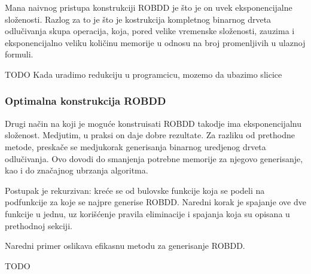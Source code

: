 Mana naivnog pristupa konstrukciji ROBDD je \v{s}to je on uvek eksponencijalne slo\v{z}enosti. Razlog za to je \v{s}to je kostrukcija kompletnog binarnog drveta odlu\v{c}ivanja skupa operacija, koja, pored velike vremenske slo\v{z}enosti, zauzima i eksponencijalno veliku koli\v{c}inu memorije u odnosu na broj promenljivih u ulaznoj formuli.

\begin{exmp}
    TODO
    Kada uradimo redukciju u programcicu, mozemo da ubazimo slicice
\end{exmp}


\subsubsection{Optimalna konstrukcija ROBDD}
\label{subsubsec:optimalROBDDConstruction}

Drugi na\v{c}in na koji je mogu\'c{}e konstruisati ROBDD takodje ima eksponencijalnu slo\v{z}enost. Medjutim, u praksi on daje dobre rezultate. Za razliku od prethodne metode, preska\v{c}e se medjukorak generisanja binarnog uredjenog drveta odlu\v{c}ivanja. Ovo dovodi do smanjenja potrebne memorije za njegovo generisanje, kao i do zna\v{c}ajnog ubrzanja algoritma.

Postupak je rekurzivan: kre\'c{}e se od bulovske funkcije koja se podeli na podfunkcije za koje se najpre generise ROBDD. Naredni korak je spajanje ove dve funkcije u jednu, uz kori\v{s}\'c{}enje pravila eliminacije i spajanja koja su opisana u prethodnoj sekciji.

Naredni primer oslikava efikasnu metodu za generisanje ROBDD.

\begin{exmp}
    TODO
\end{exmp}



